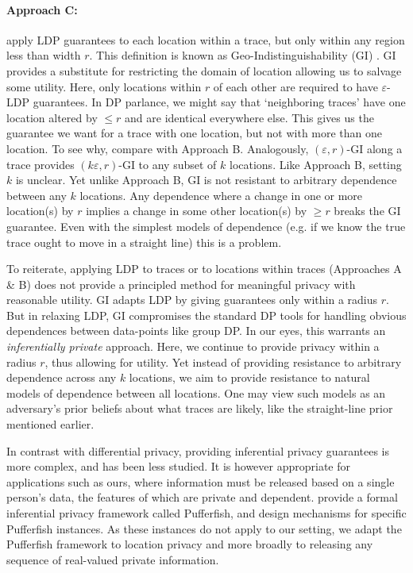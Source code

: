 \paragraph{Approach C:} apply LDP guarantees to each location within a trace, but only within any region less than width $r$. This definition is known as Geo-Indistinguishability (GI) \citep{GI}. GI provides a substitute for restricting the domain of location allowing us to salvage some utility. Here, only locations within $r$ of each other are required to have $\varepsilon$-LDP guarantees. In DP parlance, we might say that `neighboring traces' have one location altered by $\leq r$ and are identical everywhere else. This gives us the guarantee we want for a trace with one location, but not with more than one location. To see why, compare with Approach B. Analogously, $(\varepsilon, r)$-GI along a trace provides $(k \varepsilon, r)$-GI to any subset of $k$ locations. Like Approach B, setting $k$ is unclear. Yet unlike Approach B, GI is not resistant to arbitrary dependence between any $k$ locations. Any dependence where a change in one or more location(s) by $r$ implies a change in some other location(s) by $\geq r$ breaks the GI guarantee. Even with the simplest models of dependence (e.g. if we know the true trace ought to move in a straight line) this is a problem. 

To reiterate, applying LDP to traces or to locations within traces (Approaches A \& B) does not provide a principled method for meaningful privacy with reasonable utility. GI adapts LDP by giving guarantees only within a radius $r$. But in relaxing LDP, GI compromises the standard DP tools for handling obvious dependences between data-points like group DP. In our eyes, this warrants an \emph{inferentially private} approach. Here, we continue to provide privacy within a radius $r$, thus allowing for utility. Yet instead of providing resistance to arbitrary dependence across any $k$ locations, we aim to provide resistance to natural models of dependence between all locations. One may view such models as an adversary's prior beliefs about what traces are likely, like the straight-line prior mentioned earlier. 


In contrast with differential privacy, providing inferential privacy guarantees is more complex, and has been less studied. It is however appropriate for applications such as ours, where information must be released based on a single person's data, the features of which are private and dependent. \cite{pufferfish} provide a formal inferential privacy framework called Pufferfish, and design mechanisms for specific Pufferfish instances. As these instances do not apply to our setting, we adapt the Pufferfish framework to location privacy and more broadly to releasing any sequence of real-valued private information. 

